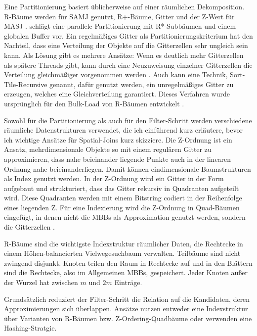\documentclass[a4paper,12pt,twoside]{article}
\begin{document}
Eine Partitionierung basiert üblicherweise auf einer räumlichen Dekomposition. R-Bäume werden für SAMJ genutzt, R+-Bäume, Gitter und der Z-Wert für MASJ {\autocite{Zhou1998}}. {\textcite{Brinkhoff1996}} schlägt eine parallele Partitionierung mit R*-Subbäumen und einem globalen Buffer vor. Ein regelmäßiges Gitter als Partitionierungskriterium hat den Nachteil, dass eine Verteilung der Objekte auf die Gitterzellen sehr ungleich sein kann. Als Lösung gibt es mehrere Ansätze: Wenn es deutlich mehr Gitterzellen als spätere Threads gibt, kann durch eine Neuzuweisung einzelner Gitterzellen die Verteilung gleichmäßiger vorgenommen werden {\autocite{Patel1996}}. Auch kann eine Technik, Sort-Tile-Recursive genannt, dafür genutzt werden, ein unregelmäßiges Gitter zu erzeugen, welches eine Gleichverteilung garantiert. Dieses Verfahren wurde ursprünglich für den Bulk-Load von R-Bäumen entwickelt {\autocite{Leutenegger1997}}.

Sowohl für die Partitionierung als auch für den Filter-Schritt werden verschiedene räumliche Datenstrukturen verwendet, die ich einführend kurz erläutere, bevor ich wichtige Ansätze für Spatial-Joins kurz skizziere. Die Z-Ordnung ist ein Ansatz, mehrdimensionale Objekte so mit einem regulären Gitter zu approximieren, dass nahe beieinander liegende Punkte auch in der linearen Ordnung nahe beieinanderliegen. Damit können eindimensionale Baumstrukturen als Index genutzt werden. In der Z-Ordnung wird ein Gitter in der Form aufgebaut und strukturiert, dass das Gitter rekursiv in Quadranten aufgeteilt wird. Diese Quadranten werden mit einem Bitstring codiert in der Reihenfolge eines liegenden Z. Für eine Indexierung wird die Z-Ordnung in Quad-Bäumen eingefügt, in denen nicht die MBBs als Approximation genutzt werden, sondern die Gitterzellen {\autocite[S. 227ff]{Rigaux2001}}.

R-Bäume sind die wichtigste Indexstruktur räumlicher Daten, die Rechtecke in einem Höhen-balancierten Vielwegesuchbaum verwalten. Teilbäume sind nicht zwingend disjunkt. Knoten teilen den Raum in Rechtecke auf und in den Blättern sind die Rechtecke, also im Allgemeinen MBBs, gespeichert. Jeder Knoten außer der Wurzel hat zwischen $m$ und $2 m$ Einträge.

Grundsätzlich reduziert der Filter-Schritt die Relation auf die Kandidaten, deren Approximierungen sich überlappen. Ansätze nutzen entweder eine Indexstruktur über Varianten von R-Bäumen bzw. Z-Ordering-Quadbäume oder verwenden eine Hashing-Stratgie.
\end{document}
